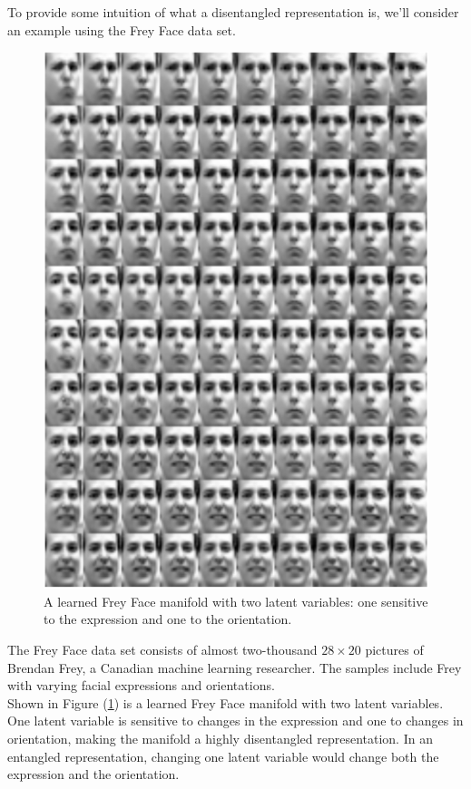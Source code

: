 \documentclass[12pt,twoside]{article}
\begin{document}
To provide some intuition of what a disentangled representation is, we'll consider an example using the Frey Face data set.\\

\begin{figure}
\includegraphics[scale=0.3]{figures/kingma_2014_4a.png}
\centering
\captionsetup{justification=centering}
\caption{A learned Frey Face manifold with two latent variables: one sensitive to the expression and one to the orientation. \cite{Kingma2014}}
\label{frey_face_disentangled}
\end{figure}

The Frey Face data set consists of almost two-thousand $28\times20$ pictures of Brendan Frey, a Canadian machine learning researcher. The samples include Frey with varying facial expressions and orientations.\\

Shown in Figure (\ref{frey_face_disentangled}) is a learned Frey Face manifold with two latent variables. One latent variable is sensitive to changes in the expression and one to changes in orientation, making the manifold a highly disentangled representation. In an entangled representation, changing one latent variable would change both the expression and the orientation.\\
\end{document}
